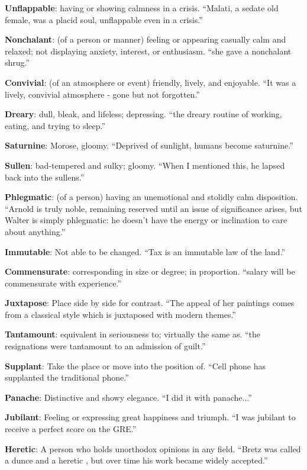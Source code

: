 \documentclass[12pt, a4paper]{ximera}
\begin{document}
\textbf{Unflappable}: having or showing calmness in a crisis. ``Malati, a sedate old female, was a placid soul, unflappable even in a crisis.''

\textbf{Nonchalant}: (of a person or manner) feeling or appearing casually calm and relaxed; not displaying anxiety, interest, or enthusiasm. ``she gave a nonchalant shrug.''

\textbf{Convivial}: (of an atmosphere or event) friendly, lively, and enjoyable. ``It was a lively, convivial atmosphere - gone but not forgotten.''

\textbf{Dreary}: dull, bleak, and lifeless; depressing. ``the dreary routine of working, eating, and trying to sleep.''

\textbf{Saturnine}: Morose, gloomy. ``Deprived of sunlight, humans become saturnine.''

\textbf{Sullen}: bad-tempered and sulky; gloomy. ``When I mentioned this, he lapsed back into the sullens.''

\textbf{Phlegmatic}: (of a person) having an unemotional and stolidly calm disposition. ``Arnold is truly noble, remaining reserved until an issue of significance arises, but Walter is simply phlegmatic: he doesn't have the energy or inclination to care about anything.''

\textbf{Immutable}: Not able to be changed. ``Tax is an immutable law of the land.''

\textbf{Commensurate}: corresponding in size or degree; in proportion. ``salary will be commensurate with experience.''

\textbf{Juxtapose}: Place side by side for contrast. ``The appeal of her paintings comes from a classical style which is juxtaposed with modern themes.''

\textbf{Tantamount}: equivalent in seriousness to; virtually the same as. ``the resignations were tantamount to an admission of guilt.''

\textbf{Supplant}: Take the place or move into the position of. ``Cell phone has supplanted the traditional phone.''

\textbf{Panache}: Distinctive and showy elegance. ``I did it with panache...''

\textbf{Jubilant}: Feeling or expressing great happiness and triumph. ``I was jubilant to receive a perfect score on the GRE.''

\textbf{Heretic}: A person who holds unorthodox opinions in any field. ``Bretz was called a dunce and a heretic , but over time his work became widely accepted.''
\end{document}
